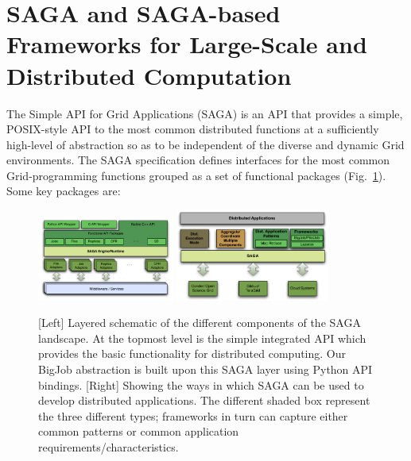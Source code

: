 \documentclass{rspublic}
\begin{document}
\vspace{-0.3cm}

\section{SAGA and SAGA-based Frameworks for Large-Scale and
 Distributed Computation}\label{Sec:SAGA}


The Simple API for Grid Applications (SAGA) is an API
that provides a simple, POSIX-style API to the most common distributed
functions at a sufficiently high-level of abstraction so as to be
independent of the diverse and dynamic Grid environments. The SAGA
specification defines interfaces for the most common Grid-programming
functions grouped as a set of functional packages
(Fig.~\ref{Fig:SAGA1}). Some key packages are:

\begin{figure}[!ht]
 \begin{center}
     \includegraphics[width=0.40\textwidth]{stci_saga_figures-1.pdf}
    \includegraphics[width=0.45\textwidth]{distributed_applications_saga_figure.pdf}
\end{center}
\caption{\small [Left] Layered schematic of the different components of
  the SAGA landscape. At the topmost level is the simple integrated
  API which provides the basic functionality for distributed
  computing. Our BigJob abstraction is built upon this SAGA layer
  using Python API bindings. [Right] Showing the ways in which SAGA can be
  used to develop distributed applications. The different shaded box
  represent the three different types; frameworks in turn can capture
  either common patterns or common application
  requirements/characteristics.} \label{Fig:SAGA1}
\end{figure}
\end{document}
